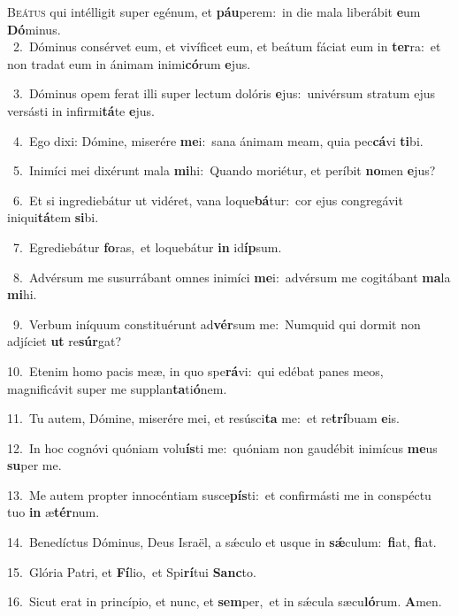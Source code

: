 \lettrine{\initial\textcolor{\initialcolor}{B}}{eátus} qui intélligit super egénum, et \textbf{páu}\-perem:~\star in die mala liberábit \textbf{e}\-um \textbf{Dó}\-minus.\\
{\numbfont\textcolor{\numbcolor}{~2.}}~Dóminus consérvet eum, et vivíficet eum, et beátum fáciat eum in \textbf{ter}\-ra:~\star et non tradat eum in ánimam inimi\-\textbf{có}\-rum \textbf{e}\-jus.\par
{\numbfont\textcolor{\numbcolor}{~3.}}~Dóminus opem ferat illi super lectum dolóris \textbf{e}\-jus:~\star univérsum stratum ejus versásti in infirmi\-\textbf{tá}\-te \textbf{e}\-jus.\par
{\numbfont\textcolor{\numbcolor}{~4.}}~Ego dixi: Dómine, miserére \textbf{me}\-i:~\star sana ánimam meam, quia pec\-\textbf{cá}\-vi \textbf{ti}\-bi.\par
{\numbfont\textcolor{\numbcolor}{~5.}}~Inimíci mei dixérunt mala \textbf{mi}\-hi:~\star Quando moriétur, et períbit \textbf{no}\-men \textbf{e}\-jus?\par
{\numbfont\textcolor{\numbcolor}{~6.}}~Et si ingrediebátur ut vidéret, vana loque\-\textbf{bá}\-tur:~\star cor ejus congregávit iniqui\-\textbf{tá}\-tem \textbf{si}\-bi.\par
{\numbfont\textcolor{\numbcolor}{~7.}}~Egrediebátur \textbf{fo}\-ras,~\star et loquebátur \textbf{in} id\-\textbf{íp}\-sum.\par
{\numbfont\textcolor{\numbcolor}{~8.}}~Advérsum me susurrábant omnes inimíci \textbf{me}\-i:~\star advérsum me cogitábant \textbf{ma}\-la \textbf{mi}\-hi.\par
{\numbfont\textcolor{\numbcolor}{~9.}}~Verbum iníquum constituérunt ad\-\textbf{vér}\-sum me:~\star Numquid qui dormit non adjíciet \textbf{ut} re\-\textbf{súr}\-gat?\par
{\numbfont\textcolor{\numbcolor}{10.}}~Etenim homo pacis meæ, in quo spe\-\textbf{rá}\-vi:~\star qui edébat panes meos, magnificávit super me supplan\-\textbf{ta}\-ti\-\textbf{ó}\-nem.\par
{\numbfont\textcolor{\numbcolor}{11.}}~Tu autem, Dómine, miserére mei, et resúsci\textbf{ta} me:~\star et re\-\textbf{trí}\-buam \textbf{e}\-is.\par
{\numbfont\textcolor{\numbcolor}{12.}}~In hoc cognóvi quóniam volu\-\textbf{ís}\-ti me:~\star quóniam non gaudébit inimícus \textbf{me}\-us \textbf{su}\-per me.\par
{\numbfont\textcolor{\numbcolor}{13.}}~Me autem propter innocéntiam susce\-\textbf{pís}\-ti:~\star et confirmásti me in conspéctu tuo \textbf{in} æ\-\textbf{tér}\-num.\par
{\numbfont\textcolor{\numbcolor}{14.}}~Benedíctus Dóminus, Deus Israël, a sǽculo et usque in \textbf{sǽ}\-culum:~\star \textbf{fi}\-at, \textbf{fi}\-at.\par
{\numbfont\textcolor{\numbcolor}{15.}}~Glória Patri, et \textbf{Fí}\-lio,~\star et Spi\-\textbf{rí}\-tui \textbf{Sanc}\-to.\par
{\numbfont\textcolor{\numbcolor}{16.}}~Sicut erat in princípio, et nunc, et \textbf{sem}\-per,~\star et in sǽcula sæcu\-\textbf{ló}\-rum. \textbf{A}\-men.\par
